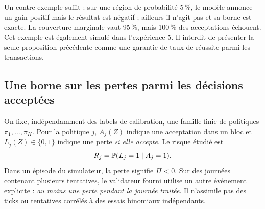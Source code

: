 Un contre-exemple suffit : sur une région de probabilité 5\,\%, le modèle annonce un gain positif mais le résultat est négatif ; ailleurs il n'agit pas et sa borne est exacte. La couverture marginale vaut 95\,\%, mais 100\,\% des acceptations échouent. Cet exemple est également simulé dans l'expérience 5. Il interdit de présenter la seule proposition précédente comme une garantie de taux de réussite parmi les transactions.

\subsection{Une borne sur les pertes parmi les décisions acceptées}

On fixe, indépendamment des labels de calibration, une famille finie de politiques \(\pi_1,\ldots,\pi_K\). Pour la politique \(j\), \(A_j(Z)\) indique une acceptation dans un bloc et \(L_j(Z)\in\{0,1\}\) indique une perte \emph{si elle accepte}. Le risque étudié est
\begin{equation}
 R_j=\mathbb P(L_j=1\mid A_j=1).
 \label{eq:ext-conditional-risk}
\end{equation}
Dans un épisode du simulateur, la perte signifie \(\Pi<0\). Sur des journées contenant plusieurs tentatives, le validateur fourni utilise un autre événement explicite : \emph{au moins une perte pendant la journée traitée}. Il n'assimile pas des ticks ou tentatives corrélés à des essais binomiaux indépendants.

